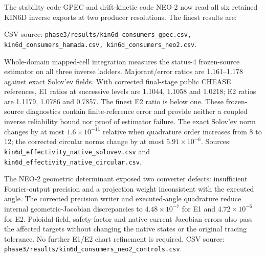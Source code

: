 \documentclass[10pt,a4paper]{article}
\newcommand{\dataref}[1]{{\footnotesize CSV source: \texttt{#1}}}
\begin{document}
The stability code GPEC and drift-kinetic code NEO-2 now read all six retained
KIN6D inverse exports at two producer resolutions. The finest results are:
\begin{center}\small

\end{center}
\dataref{phase3/results/kin6d\_consumers\_gpec.csv,
kin6d\_consumers\_hamada.csv, kin6d\_consumers\_neo2.csv}.

Whole-domain mapped-cell integration measures the status-4 frozen-source
estimator on all three inverse ladders. Majorant/error ratios are
1.161--1.178 against exact Solov'ev fields. With corrected final-stage public
CHEASE references, E1 ratios at successive levels are 1.1044, 1.1058 and
1.0218; E2 ratios are 1.1179, 1.0786 and 0.7857. The finest E2 ratio is below
one. These frozen-source diagnostics contain finite-reference error and
provide neither a coupled inverse reliability bound nor proof of estimator
failure. The exact Solov'ev norm changes by at most $1.6\times10^{-11}$
relative when quadrature order increases from 8 to 12; the corrected circular
norms change by at most $5.91\times10^{-6}$. Sources:
\texttt{kin6d\_effectivity\_native\_solovev.csv} and
\texttt{kin6d\_effectivity\_native\_circular.csv}.

The NEO-2 geometric determinant exposed two converter defects: insufficient
Fourier-output precision and a projection weight inconsistent with the executed
angle. The corrected precision writer and executed-angle quadrature reduce
internal geometric-Jacobian discrepancies to $4.48\times10^{-7}$ for E1 and
$4.72\times10^{-6}$ for E2. Poloidal-field, safety-factor and native-current
Jacobian errors also pass the affected targets without changing the native
states or the original tracing tolerance. No further E1/E2 chart refinement
is required.
\dataref{phase3/results/kin6d\_consumers\_neo2\_controls.csv}.
\end{document}
